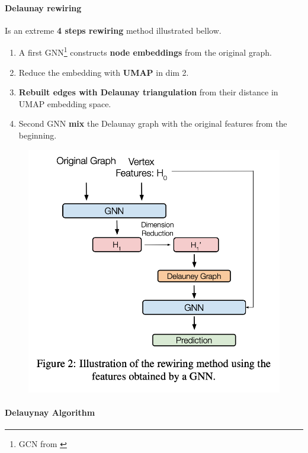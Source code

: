 \documentclass{article}
\theoremstyle{plain}
\theoremstyle{definition}
\theoremstyle{remark}
\begin{document}
\paragraph{Delaunay rewiring}
Is an extreme \textbf{4 steps rewiring} method illustrated bellow.
\begin{enumerate}
    \item A first GNN\footnote{GCN from \cite{kipf2017semi}} constructs 
        \textbf{node embeddings} from the original graph.
    \item Reduce the embedding with \textbf{UMAP} in dim 2.
    \item \textbf{Rebuilt edges with Delaunay triangulation} from their distance in UMAP embedding space.
    \item Second GNN \textbf{mix} the Delaunay graph with the original features 
    from the beginning.
\end{enumerate}
\begin{figure}[ht!]
    \begin{center}
    \vskip -0.2in
    \includegraphics[width=0.9\columnwidth]{figures/Rewiring_method.png}
    \vskip -0.2in
    \label{fig:delaunay_rewiring}
    \end{center}
    \end{figure}

\paragraph{Delauynay Algorithm}
\end{document}
